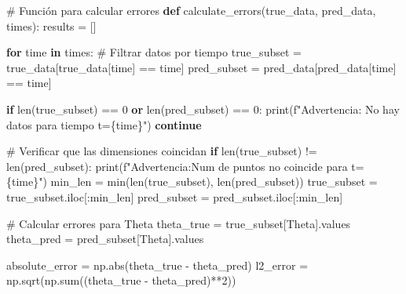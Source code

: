 \documentclass[
  spanish,
  us-letterpaper,
  DIV=11,
  numbers=noendperiod]{scrreprt}
\newenvironment{Shaded}{\begin{snugshade}}{\end{snugshade}}
\newcommand{\BuiltInTok}[1]{\textcolor[rgb]{0.00,0.23,0.31}{#1}}
\newcommand{\CommentTok}[1]{\textcolor[rgb]{0.37,0.37,0.37}{#1}}
\newcommand{\ControlFlowTok}[1]{\textcolor[rgb]{0.00,0.23,0.31}{\textbf{#1}}}
\newcommand{\DecValTok}[1]{\textcolor[rgb]{0.68,0.00,0.00}{#1}}
\newcommand{\KeywordTok}[1]{\textcolor[rgb]{0.00,0.23,0.31}{\textbf{#1}}}
\newcommand{\NormalTok}[1]{\textcolor[rgb]{0.00,0.23,0.31}{#1}}
\newcommand{\OperatorTok}[1]{\textcolor[rgb]{0.37,0.37,0.37}{#1}}
\newcommand{\SpecialCharTok}[1]{\textcolor[rgb]{0.37,0.37,0.37}{#1}}
\newcommand{\SpecialStringTok}[1]{\textcolor[rgb]{0.13,0.47,0.30}{#1}}
\newcommand{\StringTok}[1]{\textcolor[rgb]{0.13,0.47,0.30}{#1}}
\theoremstyle{plain}
\theoremstyle{definition}
\theoremstyle{remark}
\begin{document}
\begin{Shaded}
\begin{Highlighting}[]
\CommentTok{\# Función para calcular errores}
\KeywordTok{def}\NormalTok{ calculate\_errors(true\_data, pred\_data, times):}
\NormalTok{    results }\OperatorTok{=}\NormalTok{ []}
    
    \ControlFlowTok{for}\NormalTok{ time }\KeywordTok{in}\NormalTok{ times:}
        \CommentTok{\# Filtrar datos por tiempo}
\NormalTok{        true\_subset }\OperatorTok{=}\NormalTok{ true\_data[true\_data[}\StringTok{\textquotesingle{}time\textquotesingle{}}\NormalTok{] }\OperatorTok{==}\NormalTok{ time]}
\NormalTok{        pred\_subset }\OperatorTok{=}\NormalTok{ pred\_data[pred\_data[}\StringTok{\textquotesingle{}time\textquotesingle{}}\NormalTok{] }\OperatorTok{==}\NormalTok{ time]}
        
        \ControlFlowTok{if} \BuiltInTok{len}\NormalTok{(true\_subset) }\OperatorTok{==} \DecValTok{0} \KeywordTok{or} \BuiltInTok{len}\NormalTok{(pred\_subset) }\OperatorTok{==} \DecValTok{0}\NormalTok{:}
            \BuiltInTok{print}\NormalTok{(}\SpecialStringTok{f"Advertencia: No hay datos para tiempo t=}\SpecialCharTok{\{}\NormalTok{time}\SpecialCharTok{\}}\SpecialStringTok{"}\NormalTok{)}
            \ControlFlowTok{continue}
        
        \CommentTok{\# Verificar que las dimensiones coincidan}
        \ControlFlowTok{if} \BuiltInTok{len}\NormalTok{(true\_subset) }\OperatorTok{!=} \BuiltInTok{len}\NormalTok{(pred\_subset):}
            \BuiltInTok{print}\NormalTok{(}\SpecialStringTok{f"Advertencia:Num de puntos no coincide para t=}\SpecialCharTok{\{}\NormalTok{time}\SpecialCharTok{\}}\SpecialStringTok{"}\NormalTok{)}
\NormalTok{            min\_len }\OperatorTok{=} \BuiltInTok{min}\NormalTok{(}\BuiltInTok{len}\NormalTok{(true\_subset), }\BuiltInTok{len}\NormalTok{(pred\_subset))}
\NormalTok{            true\_subset }\OperatorTok{=}\NormalTok{ true\_subset.iloc[:min\_len]}
\NormalTok{            pred\_subset }\OperatorTok{=}\NormalTok{ pred\_subset.iloc[:min\_len]}
        
        \CommentTok{\# Calcular errores para Theta}
\NormalTok{        theta\_true }\OperatorTok{=}\NormalTok{ true\_subset[}\StringTok{\textquotesingle{}Theta\textquotesingle{}}\NormalTok{].values}
\NormalTok{        theta\_pred }\OperatorTok{=}\NormalTok{ pred\_subset[}\StringTok{\textquotesingle{}Theta\textquotesingle{}}\NormalTok{].values}
        
\NormalTok{        absolute\_error }\OperatorTok{=}\NormalTok{ np.}\BuiltInTok{abs}\NormalTok{(theta\_true }\OperatorTok{{-}}\NormalTok{ theta\_pred)}
\NormalTok{        l2\_error }\OperatorTok{=}\NormalTok{ np.sqrt(np.}\BuiltInTok{sum}\NormalTok{((theta\_true }\OperatorTok{{-}}\NormalTok{ theta\_pred)}\OperatorTok{**}\DecValTok{2}\NormalTok{))}
        

\end{Highlighting}
\end{Shaded}
\end{document}
